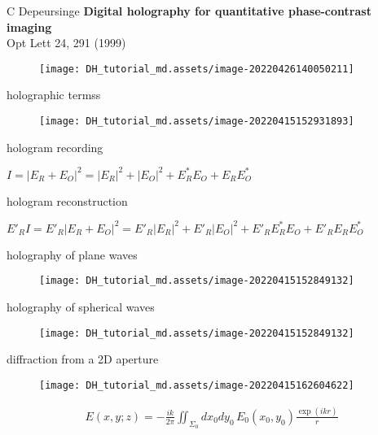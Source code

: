 \documentclass[t, aspectratio=169]{beamer}
\begin{document}
\begin{frame}{C Depeursinge}
	\textbf{Digital holography for quantitative phase-contrast imaging}\\
	Opt Lett 24, 291 (1999)

	\begin{figure}
		\texttt{[image: DH\_tutorial\_md.assets/image-20220426140050211]}
	\end{figure}

\end{frame}


\begin{frame}{holographic termss}
	\begin{figure}
		\texttt{[image: DH\_tutorial\_md.assets/image-20220415152931893]}
	\end{figure}
	
	hologram recording \\
	\begin{center}
		$I = |E_R + E_O|^2 = |E_R|^2 + |E_O|^2 +E_R^*E_O + E_RE_O^*$
	\end{center}
	
	hologram reconstruction \\
	\begin{center}
		$E'_RI = E'_R|E_R+E_O|^2 
		=E'_R|E_R|^2 + E'_R|E_O|^2 + E'_RE_R^*E_O + E'_RE_RE_O^*$
	\end{center}

\end{frame}


\begin{frame}{holography of plane waves}
	\begin{figure}
		\texttt{[image: DH\_tutorial\_md.assets/image-20220415152849132]}
	\end{figure}
\end{frame}


\begin{frame}{holography of spherical waves}
	\begin{figure}
		\texttt{[image: DH\_tutorial\_md.assets/image-20220415152849132]}
	\end{figure}
\end{frame}


\begin{frame}{diffraction from a 2D aperture}
	\begin{figure}
		\texttt{[image: DH\_tutorial\_md.assets/image-20220415162604622]}
	\end{figure}

	\begin{gather*}
E(x,y;z) = -\frac{ik}{2\pi}\iint_{\Sigma_0} dx_0dy_0\,E_0(x_0,y_0)\frac{\exp(ikr)}{r}
	\end{gather*}

\end{frame}
\end{document}
